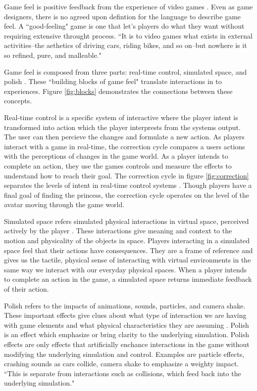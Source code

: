 Game feel is positive feedback from the experience of video games \cite{swink2009game}. Even as game designers, there is no agreed upon defintion for the language to describe game feel. A ``good-feeling" game is one that let's players do what they want without requiring extensive throught process. ``It is to video games what exists in external activities--the aethetics of driving cars, riding bikes, and so on--but nowhere is it so refined, pure, and malleable." \cite{swink2009game}

Game feel is composed from three parts: real-time control, simulated space, and polish \cite{swink2009game}. These ``building blocks of game feel" translate interactions in to experiences. Figure \ref{fig:blocks} demonstrates the connections between these concepts. 

Real-time control is a specific system of interactive where the player intent is transformed into action which the player interprests from the systems output. The user can then percieve the changes and formulate a new action. As players interact with a game in real-time, the correction cycle compares a users actions with the perceptions of changes in the game world. As a player intends to complete an action, they use the games controls and measure the effects to understand how to reach their goal. The correction cycle in figure \ref{fig:correction} separates the levels of intent in real-time control systems \cite{swink2009game}. Though players have a final goal of finding the princess, the correction cycle operates on the level of the avatar moving through the game world. 

Simulated space refers simulated physical interactions in virtual space, perceived actively by the player \cite{swink2009game}. These interactions give meaning and context to the motion and physicality of the objects in space. Players interacting in a simulated space feel that their actions have consequences. They are a frame of reference and gives us the tactile, physical sense of interacting with virtual environments in the same way we interact with our everyday physical spaces. When a player intends to complete an action in the game, a simulated space returns immediate feedback of their action.

Polish refers to the impacts of animations, sounds, particles, and camera shake. These important effects give clues about what type of interaction we are having with game elements and what physical characteristics they are assuming \cite{swink2009game}. Polish is an effect which emphasize or bring clarity to the underlying simulation. Polish effects are only effects that artificially enchance interactions in the game without modifying the underlying simulation and control. Examples are particle effects, crashing sounds as cars collide, camera shake to emphasize a weighty impact. ``This is separate from interactions such as collisions, which feed back into the underlying simulation." \cite{swink2009game}

